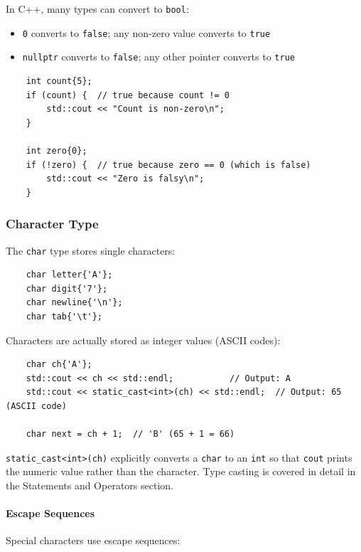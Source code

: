 In C++, many types can convert to \texttt{bool}:
\begin{itemize}
	\item \texttt{0} converts to \texttt{false}; any non-zero value converts to \texttt{true}
	\item \texttt{nullptr} converts to \texttt{false}; any other pointer converts to \texttt{true}
\end{itemize}

\begin{lstlisting}
	int count{5};
	if (count) {  // true because count != 0
		std::cout << "Count is non-zero\n";
	}
	
	int zero{0};
	if (!zero) {  // true because zero == 0 (which is false)
		std::cout << "Zero is falsy\n";
	}
\end{lstlisting}

\subsubsection{Character Type}

The \texttt{char} type stores single characters:

\begin{lstlisting}
	char letter{'A'};
	char digit{'7'};
	char newline{'\n'};
	char tab{'\t'};
\end{lstlisting}

Characters are actually stored as integer values (ASCII codes):

\begin{lstlisting}
	char ch{'A'};
	std::cout << ch << std::endl;           // Output: A
	std::cout << static_cast<int>(ch) << std::endl;  // Output: 65 (ASCII code)

	char next = ch + 1;  // 'B' (65 + 1 = 66)
\end{lstlisting}

\begin{remark}
	\texttt{static\_cast<int>(ch)} explicitly converts a \texttt{char} to an \texttt{int} so that \texttt{cout} prints the numeric value rather than the character. Type casting is covered in detail in the Statements and Operators section.
\end{remark}

\paragraph{Escape Sequences}

Special characters use escape sequences:


